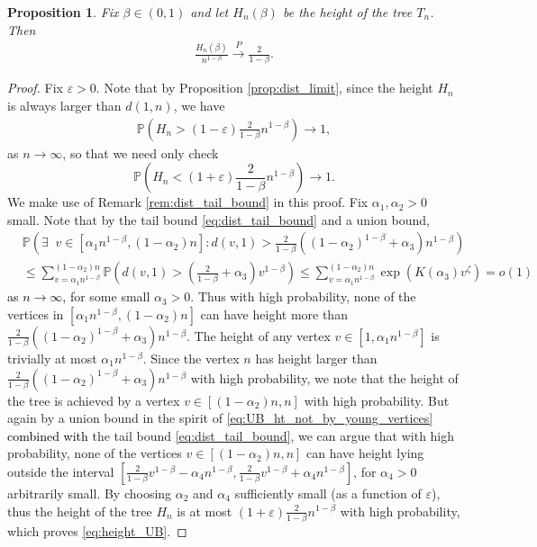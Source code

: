 \documentclass[letterpaper,11pt,reqno]{amsart}
\newtheorem{prop}[thm]{Proposition}
\theoremstyle{definition}
\renewcommand{\leq}{\leqslant}
\newcommand{\eps}{\varepsilon}
\newcommand{\prob}{\mathbb{P}}
\newcommand{\convp}{\stackrel{P}{\longrightarrow}}
\begin{document}
\begin{prop}
    Fix $\beta \in (0,1)$ and let $H_n(\beta)$ be the height of the tree $T_n$. Then
    \begin{align*}
        \frac{H_n(\beta)}{n^{1-\beta}}\convp \frac{2}{1-\beta}.
    \end{align*}
\end{prop}
\begin{proof}
Fix $\eps>0$. Note that by Proposition \ref{prop:dist_limit}, since the height $H_n$ is always larger than $d(1,n)$, we have
\begin{align*}
    \prob\left(H_n>(1-\eps)\frac{2}{1-\beta}n^{1-\beta} \right)\to 1,
\end{align*}
as $n \to \infty$, so that we need only check
\begin{equation}\label{eq:height_UB}
    \prob\left(H_n<(1+\eps)\frac{2}{1-\beta}n^{1-\beta} \right)\to 1.
\end{equation}
We make use of Remark \ref{rem:dist_tail_bound} in this proof. Fix $\alpha_1,\alpha_2>0$ small. Note that by the tail bound \eqref{eq:dist_tail_bound} and a union bound,
\begin{equation}\label{eq:UB_ht_not_by_young_vertices}
\begin{split}
    &\prob\left(\exists\;\;v\in[\alpha_1n^{1-\beta},(1-\alpha_2)n]:d(v,1)> \frac{2}{1-\beta}((1-\alpha_2)^{1-\beta}+\alpha_3)n^{1-\beta}\right)\\& \leq \sum_{v=\alpha_1 n^{1-\beta}}^{(1-\alpha_2) n}\prob\left(d(v,1)>\left(\frac{2}{1-\beta}+\alpha_3\right)v^{1-\beta} \right)\leq \sum_{v=\alpha_1n^{1-\beta}}^{(1-\alpha_2)n}\exp\left(K(\alpha_3)v^{\zeta} \right)=o(1)
    \end{split}
\end{equation}
\textcolor{black}{as $n \to \infty$,} for some small $\alpha_3>0$. Thus with high probability, none of the vertices in $[\alpha_1n^{1-\beta},(1-\alpha_2)n]$ can have height more than $\frac{2}{1-\beta}((1-\alpha_2)^{1-\beta}+\alpha_3)n^{1-\beta}$. The height of any vertex $v \in [1,\alpha_1n^{1-\beta}]$ is trivially at most $\alpha_1n^{1-\beta}$. Since the vertex $n$ has height larger than $\frac{2}{1-\beta}((1-\alpha_2)^{1-\beta}+\alpha_3)n^{1-\beta}$ with high probability, we note that the height of the tree is achieved by a vertex $v \in [(1-\alpha_2)n,n]$ with high probability. But again by a union bound in the spirit of \eqref{eq:UB_ht_not_by_young_vertices} \textcolor{black}{combined with} the tail bound \eqref{eq:dist_tail_bound}, we can argue that with high probability, none of the vertices $v \in [(1-\alpha_2)n,n]$ can have height lying outside the interval $[\frac{2}{1-\beta}v^{1-\beta}-\alpha_4n^{1-\beta},\frac{2}{1-\beta}v^{1-\beta}+\alpha_4n^{1-\beta}]$, for $\alpha_4>0$ arbitrarily small. By choosing $\alpha_2$ and $\alpha_4$ sufficiently small (as a function of $\eps$), thus the height of the tree $H_n$ is at most $(1+\eps)\frac{2}{1-\beta}n^{1-\beta}$ with high probability, which proves \eqref{eq:height_UB}. \end{proof}
\end{document}
